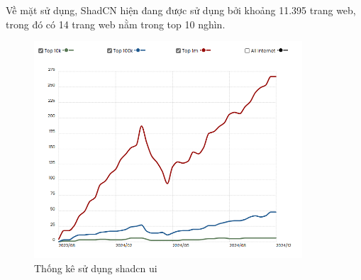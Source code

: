 \begin{enumerate}[(a)]
            Về mặt sử dụng, ShadCN hiện đang được sử dụng bởi khoảng 11.395 trang web, trong đó có 14 trang web nằm trong top 10 nghìn.

            \begin{figure}[H]
                \centering
                \includegraphics[width=10cm]{Images/shadcn-stats.png}
                \vspace{0.5cm}
                \caption{Thống kê sử dụng shadcn ui \cite{ShadcnUI}}
                \label{fig:my_label}
            \end{figure}
            

    \end{enumerate}

